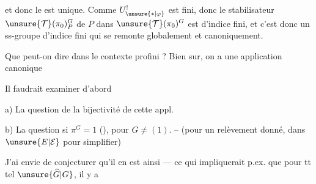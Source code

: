 et donc le  est unique. Comme
$U^{!}_{\unsure{*|\varphi}}$ est fini, donc le stabilisateur
$\unsure{\mathcal T}(\pi_0)^G_P$ de $P$ dans
$\unsure{\mathcal T}(\pi_0)^G$ est d'indice fini,
et c'est donc un ss-groupe d'indice fini qui se remonte
globalement et canoniquement.

Que peut-on dire dans le contexte profini ? Bien sur,
on a une application canonique

Il faudrait examiner d'abord

a) La question de la bijectivité de cette appl.

b) La question si $\pi^G=1$ (),
pour $G\ne(1)$. -- (pour un relèvement donné,
dans $\unsure{E|\mathcal E}$ pour simplifier)

J'ai envie de conjecturer 
qu'il en est ainsi --- ce qui impliquerait
p.ex. que pour tt tel  $\unsure{\widehat G|G}$, il y a


